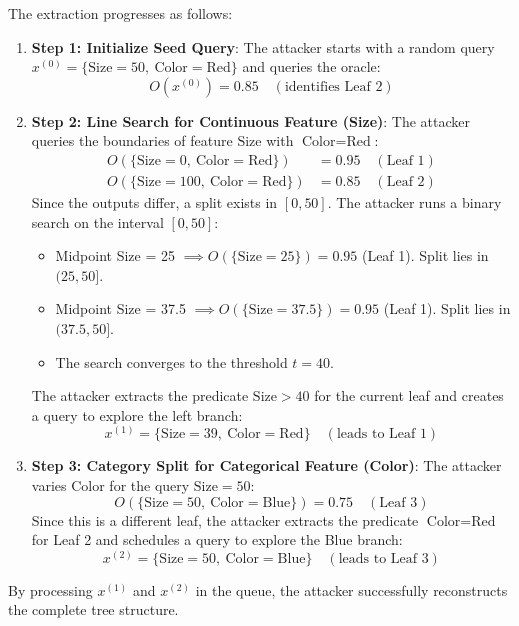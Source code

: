 \documentclass{article}
\begin{document}
The extraction progresses as follows:
\begin{enumerate}
    \item \textbf{Step 1: Initialize Seed Query}:
    The attacker starts with a random query $x^{(0)} = \{\text{Size} = 50, \ \text{Color} = \text{Red}\}$ and queries the oracle:
    $$O(x^{(0)}) = 0.85 \quad (\text{identifies Leaf 2})$$
    
    \item \textbf{Step 2: Line Search for Continuous Feature (Size)}:
    The attacker queries the boundaries of feature $\text{Size}$ with $\text{Color} = \text{Red}$:
    \begin{align*}
        O(\{\text{Size} = 0, \ \text{Color} = \text{Red}\}) &= 0.95 \quad (\text{Leaf 1}) \\
        O(\{\text{Size} = 100, \ \text{Color} = \text{Red}\}) &= 0.85 \quad (\text{Leaf 2})
    \end{align*}
    Since the outputs differ, a split exists in $[0, 50]$. The attacker runs a binary search on the interval $[0, 50]$:
    \begin{itemize}
        \item Midpoint Size = 25 $\implies O(\{\text{Size} = 25\}) = 0.95$ (Leaf 1). Split lies in $(25, 50]$.
        \item Midpoint Size = 37.5 $\implies O(\{\text{Size} = 37.5\}) = 0.95$ (Leaf 1). Split lies in $(37.5, 50]$.
        \item The search converges to the threshold $t = 40$.
    \end{itemize}
    The attacker extracts the predicate $\text{Size} > 40$ for the current leaf and creates a query to explore the left branch:
    $$x^{(1)} = \{\text{Size} = 39, \ \text{Color} = \text{Red}\} \quad (\text{leads to Leaf 1})$$
    
    \item \textbf{Step 3: Category Split for Categorical Feature (Color)}:
    The attacker varies $\text{Color}$ for the query $\text{Size} = 50$:
    $$O(\{\text{Size} = 50, \ \text{Color} = \text{Blue}\}) = 0.75 \quad (\text{Leaf 3})$$
    Since this is a different leaf, the attacker extracts the predicate $\text{Color} = \text{Red}$ for Leaf 2 and schedules a query to explore the Blue branch:
    $$x^{(2)} = \{\text{Size} = 50, \ \text{Color} = \text{Blue}\} \quad (\text{leads to Leaf 3})$$
\end{enumerate}

By processing $x^{(1)}$ and $x^{(2)}$ in the queue, the attacker successfully reconstructs the complete tree structure.
\end{document}
